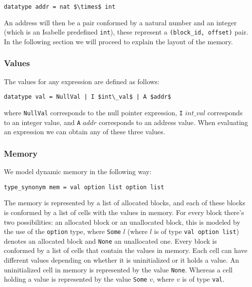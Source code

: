 \begin{lstlisting}[frame=single, mathescape=true]
datatype addr = nat $\times$ int
\end{lstlisting}

An address will then be a pair conformed by a natural number and an integer (which is an Isabelle predefined \verb|int|), these represent a \verb|(block_id, offset)| pair.
In the following section we will proceed to explain the layout of the memory.

\subsubsection{Values} The values for any expression are defined as follows:

\begin{lstlisting}[frame=single, mathescape=true]
datatype val = NullVal | I $int\_val$ | A $addr$
\end{lstlisting}

where \verb|NullVal| corresponds to the null pointer expression, \verb|I| $int\_val$ corresponds to an integer value, and \verb|A| $addr$ corresponds to an address value.
When evaluating an expression we can obtain any of these three values.

\subsubsection{Memory}

We model dynamic memory in the following way:

\begin{lstlisting}[frame=single, mathescape=true]
type_synonym mem = val option list option list
\end{lstlisting}

The memory is represented by a list of allocated blocks, and each of these blocks is conformed by a list of cells with the values in memory.
For every block there's two possibilities: an allocated block or an unallocated block, this is modeled by the use of the \verb|option| type, where \verb|Some| $l$ (where $l$ is of type \verb|val option list|) denotes an allocated block and \verb|None| an unallocated one.
Every block is conformed by a list of cells that contain the values in memory.
Each cell can have different values depending on whether it is uninitialized or it holds a value.
An uninitialized cell in memory is represented by the value \verb|None|.
Whereas a cell holding a value is represented by the value \verb|Some| $v$, where $v$ is of type \verb|val|.

